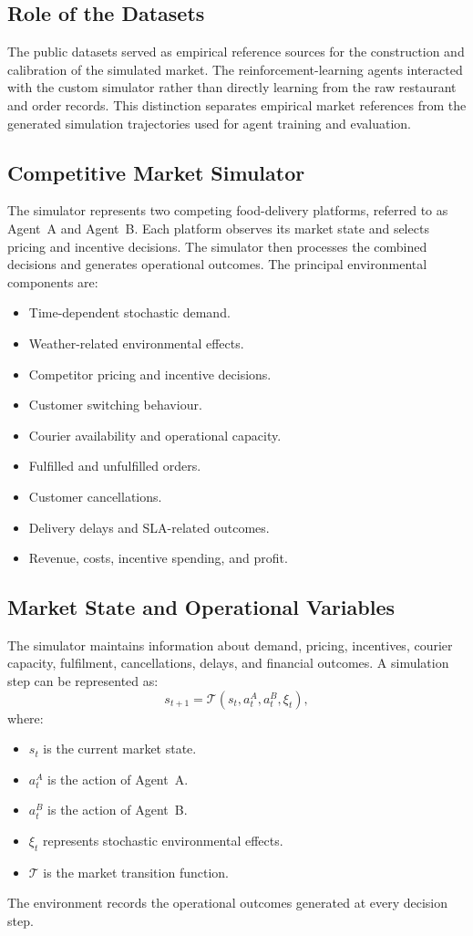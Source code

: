 \documentclass[conference]{IEEEtran}
\begin{document}
\subsection{Role of the Datasets}
The public datasets served as empirical reference sources for the construction and calibration of the simulated market. The reinforcement-learning agents interacted with the custom simulator rather than directly learning from the raw restaurant and order records. This distinction separates empirical market references from the generated simulation trajectories used for agent training and evaluation.

\subsection{Competitive Market Simulator}
The simulator represents two competing food-delivery platforms, referred to as Agent~A and Agent~B. Each platform observes its market state and selects pricing and incentive decisions. The simulator then processes the combined decisions and generates operational outcomes. The principal environmental components are:
\begin{itemize}
  \item Time-dependent stochastic demand.
  \item Weather-related environmental effects.
  \item Competitor pricing and incentive decisions.
  \item Customer switching behaviour.
  \item Courier availability and operational capacity.
  \item Fulfilled and unfulfilled orders.
  \item Customer cancellations.
  \item Delivery delays and SLA-related outcomes.
  \item Revenue, costs, incentive spending, and profit.
\end{itemize}

\subsection{Market State and Operational Variables}
The simulator maintains information about demand, pricing, incentives, courier capacity, fulfilment, cancellations, delays, and financial outcomes. A simulation step can be represented as:
\begin{equation}
  s_{t+1} = \mathcal{T}\left(s_t, a_t^{A}, a_t^{B}, \xi_t\right),
\end{equation}
where:
\begin{itemize}
  \item $s_t$ is the current market state.
  \item $a_t^{A}$ is the action of Agent~A.
  \item $a_t^{B}$ is the action of Agent~B.
  \item $\xi_t$ represents stochastic environmental effects.
  \item $\mathcal{T}$ is the market transition function.
\end{itemize}
The environment records the operational outcomes generated at every decision step.
\end{document}
